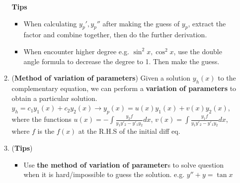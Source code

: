\documentclass[10pt, landscape]{article}
\begin{document}
\begin{multicols}{4}
\begin{enumerate}
\begin{enumerate}
\begin{itemize}
\begin{enumerate}
            \end{enumerate}
        \end{itemize}
        \textbf{Tips}
        \begin{itemize}
            \item When calculating $y_p',y_p''$ after making the guess of $y_p$, extract the factor and combine together, then do the further derivation.
            \item When encounter higher degree e.g. $\sin^2x,\cos^2x$, use the double angle formula to decrease the degree to 1. Then make the guess.
        \end{itemize}
        \item (\textbf{Method of variation of parameters}) Given a solution $y_h(x)$ to the complementary equation, we can perform a \textbf{variation of parameters} to obtain a particular solution. $y_h=c_1y_1(x)+c_2y_2(x)\rightarrow y_p(x)=u(x)y_1(x)+v(x)y_2(x)$, where the functions $u(x)=-\int \frac{y_2f}{y_1y'_2-y'_1y_2}dx$, $v(x)=\int \frac{y_1f}{y_1y'_2-y'_1y_2}dx$, where $f$ is the $f(x)$ at the R.H.S of the initial diff eq.
        \item (\textbf{Tips})
        \begin{itemize}
            \item Use \textbf{the method of variation of parameter}s to solve question when it is hard/impossible to guess the solution. e.g. $y''+y=\tan x$
        \end{itemize}
    \end{enumerate}
\end{enumerate}

\end{multicols}
\end{document}
